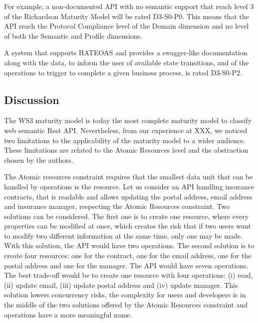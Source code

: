 For example, a non-documented API with no semantic support that reach level 3 of the Richardson Maturity Model will be rated D3-S0-P0. This means that the API reach the Protocol Compliance level of the Domain dimension and no level of both the Semantic and Profile dimensions.


A system that supports HATEOAS and provides a swagger-like documentation along with the data, to inform the user of available state transitions, and of the operations to trigger to complete a given business process, is rated D3-S0-P2.

\subsection{Discussion}

The WS3 maturity model is today the most complete maturity model to classify web semantic Rest API. Nevertheless, from our experience at XXX, we noticed two limitations to the applicability of the maturity model to a wider audience. These limitations are related to the Atomic Resources level and the abstraction chosen by the authors.

The Atomic resources constraint requires that the smallest data unit that can be handled by operations is the resource. Let us consider an API handling insurance contracts, that is readable and allows updating the postal address, email address and insurance manager, respecting the Atomic Resources constraint.  Two solutions can be considered. The first one is to create one resource, where every properties can be modified at once, which creates the risk that if two users want to modify two different information at the same time, only one may be made. With this solution, the API would have two operations. The second solution is to create four resources: one for the contract, one for the email address, one for the postal address and one for the manager. The API would have seven operations. The best trade-off would be to create one resource with four operations: (i) read, (ii) update email, (iii) update postal address and (iv) update manager. This solution lowers concurrency risks, the complexity for users and developers is in the middle of the two solutions offered by the Atomic Resources constraint and operations have a more meaningful name.

